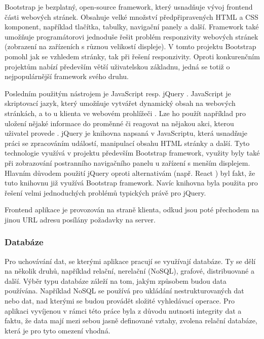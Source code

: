 Bootstrap je bezplatný, open-source framework, který usnadňuje vývoj frontend části webových stránek. Obsahuje velké množství předpřipravených HTML a CSS komponent, například tlačítka, tabulky, navigační panely a další. Framework také umožňuje programátorovi jednoduše řešit problém responzivity webových stránek (zobrazení na zařízeních s různou velikostí displeje). V tomto projektu Bootstrap pomohl jak se vzhledem stránky, tak při řešení responzivity. Oproti konkurenčním projektům nabízí především větší uživatelskou základnu, jedná se totiž o nejpopulárnější framework svého druhu. \cite{bootstrap-w3s, bootstrap}

Posledním použitým nástrojem je JavaScript resp. jQuery \cite{jquery}. JavaScript je skriptovací jazyk, který umožňuje vytvářet dynamický obsah na webových stránkách, a to u klienta ve webovém prohlížeči \cite{what-is-js}. Lze ho použít například pro uložení nějaké informace do proměnné či reagovat na nějakou akci, kterou uživatel provede \cite{what-is-js}. jQuery je knihovna napsaná v JavaScriptu, která usnadňuje práci se zpracováním událostí, manipulací obsahu HTML stránky a další. Tyto technologie využívá v projektu především Bootstrap framework, využity byly také při zobrazování postranního navigačního panelu u zařízení s menším displejem. Hlavním důvodem použití jQuery oproti alternativám (např. React \cite{react}) byl fakt, že tuto knihovnu již využívá Bootstrap framework. Navíc knihovna byla použita pro řešení velmi jednoduchých problémů typických právě pro jQuery.

Frontend aplikace je provozován na straně klienta, odkud jsou poté přechodem na jinou URL adresu posílány požadavky na server.

\subsubsection{Databáze}
Pro uchovávání dat, se kterými aplikace pracují se využívají databáze. Ty se dělí na několik druhů, například relační, nerelační (NoSQL), grafové, distribuované a další. Výběr typu databáze záleží na tom, jakým způsobem budou data používána. Například NoSQL se používá pro ukládání nestrukturovaných dat nebo dat, nad kterými se budou provádět složité vyhledávací operace. Pro aplikaci vyvíjenou v rámci této práce byla z důvodu nutnosti integrity dat a faktu, že data mají mezi sebou jasně definované vztahy, zvolena relační databáze, která je pro tyto omezení vhodná. \cite{co-je-sql, sql-vs-nosql}

